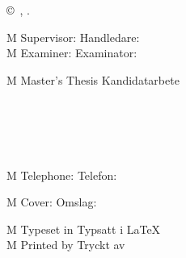 \begingroup %
\newpage
\thispagestyle{empty}
\vspace*{4.5cm}
\thesisImprintTitle\\
\thesisImprintSubtitle\\
\thesisAuthor \setlength{\parskip}{1cm}

\copyright~\thesisAuthor, \thesisYear. \setlength{\parskip}{1cm}

\if\thesisType M
    Supervisor:
\else
    Handledare:
\fi
\thesisSupervisor\\
\if\thesisType M
    Examiner:
\else
    Examinator:
\fi
\thesisExaminer \setlength{\parskip}{1cm}

\if\thesisType M
    Master's Thesis
\else
    Kandidatarbete
\fi
\thesisYear\\
\thesisDepartment\\
\thesisDivision\\
\ifx\thesisGroup\undefined
\else
\thesisGroup\\
\fi
\thesisUniversity\\
\thesisImprintLocation\\
\if\thesisType M
    Telephone:
\else
    Telefon:
\fi
\thesisUniversityTel \setlength{\parskip}{0.5cm}

\vfill
\ifx\thesisCoverFigure\undefined
\else
    \if\thesisType M
        Cover:
    \else
        Omslag:
    \fi
    \thesisCoverFigureCaption
    \setlength{\parskip}{0.5cm}
\fi

\if\thesisType M
    Typeset in
\else
    Typsatt i
\fi
\LaTeX\\
\ifx\thesisPrintedBy\undefined
\else
    \if\thesisType M
        Printed by
    \else
        Tryckt av
    \fi
    \thesisPrintedBy\\
\fi
\thesisLocation\ \thesisYear
\endgroup
